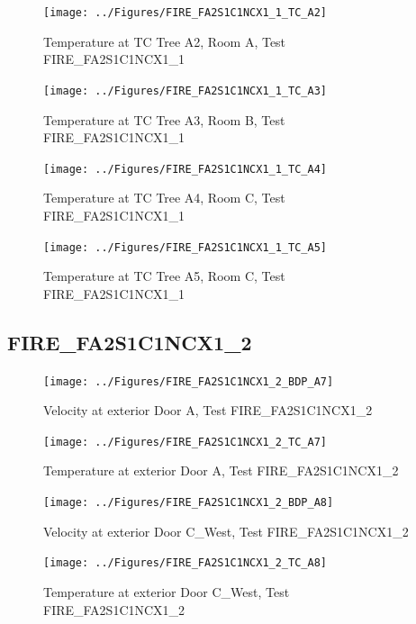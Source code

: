 \documentclass[11pt,oneside]{book}
\begin{document}
\begin{figure}[!ht]
\texttt{[image: ../Figures/FIRE\_FA2S1C1NCX1\_1\_TC\_A2]}
\caption{Temperature at TC Tree A2, Room A, Test FIRE\_FA2S1C1NCX1\_1}
\label{fig:FIRE_FA2S1C1NCX1_1_TC_A2}
\end{figure}

\begin{figure}[!ht]
\texttt{[image: ../Figures/FIRE\_FA2S1C1NCX1\_1\_TC\_A3]}
\caption{Temperature at TC Tree A3, Room B, Test FIRE\_FA2S1C1NCX1\_1}
\label{fig:FIRE_FA2S1C1NCX1_1_TC_A3}
\end{figure}

\begin{figure}[!ht]
\texttt{[image: ../Figures/FIRE\_FA2S1C1NCX1\_1\_TC\_A4]}
\caption{Temperature at TC Tree A4, Room C, Test FIRE\_FA2S1C1NCX1\_1}
\label{fig:FIRE_FA2S1C1NCX1_1_TC_A4}
\end{figure}

\begin{figure}[!ht]
\texttt{[image: ../Figures/FIRE\_FA2S1C1NCX1\_1\_TC\_A5]}
\caption{Temperature at TC Tree A5, Room C, Test FIRE\_FA2S1C1NCX1\_1}
\label{fig:FIRE_FA2S1C1NCX1_1_TC_A5}
\end{figure}


\clearpage


\subsection{FIRE\_FA2S1C1NCX1\_2}

\begin{figure}[!ht]
\texttt{[image: ../Figures/FIRE\_FA2S1C1NCX1\_2\_BDP\_A7]}
\caption{Velocity at exterior Door A, Test FIRE\_FA2S1C1NCX1\_2}
\label{fig:FIRE_FA2S1C1NCX1_2_BDP_A7}
\end{figure}

\begin{figure}[!ht]
\texttt{[image: ../Figures/FIRE\_FA2S1C1NCX1\_2\_TC\_A7]}
\caption{Temperature at exterior Door A, Test FIRE\_FA2S1C1NCX1\_2}
\label{fig:FIRE_FA2S1C1NCX1_2_TC_A7}
\end{figure}

\begin{figure}[!ht]
\texttt{[image: ../Figures/FIRE\_FA2S1C1NCX1\_2\_BDP\_A8]}
\caption{Velocity at exterior Door C\_West, Test FIRE\_FA2S1C1NCX1\_2}
\label{fig:FIRE_FA2S1C1NCX1_2_BDP_A8}
\end{figure}

\begin{figure}[!ht]
\texttt{[image: ../Figures/FIRE\_FA2S1C1NCX1\_2\_TC\_A8]}
\caption{Temperature at exterior Door C\_West, Test FIRE\_FA2S1C1NCX1\_2}
\label{fig:FIRE_FA2S1C1NCX1_2_TC_A8}
\end{figure}
\end{document}
